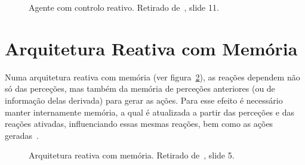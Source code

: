 \begin{figure}[H]
    \begin{center}
    \end{center}
    \caption{Agente com controlo reativo.
    Retirado de~\cite{isel:iasa:slides:arq-agentes-reativos-parte-2}, slide 11.}\label{fig:controle-reativo}
\end{figure}


\section{Arquitetura Reativa com Memória}\label{sec:arquiteturas-reativa-memoria}

Numa arquitetura reativa com memória (ver figura~\ref{fig:arquitetura-reativa-memoria}), as reações dependem não só das perceções, mas também da memória de perceções anteriores (ou de informação delas derivada) para gerar as
ações. Para esse efeito é necessário manter internamente memória, a qual é atualizada a partir das
perceções e das reações ativadas, influenciando essas mesmas reações, bem como as ações
geradas~\cite{isel:iasa:slides:arq-agentes-reativos-parte-3}.

\begin{figure}[H]
    \begin{center}
    \end{center}
    \caption{Arquitetura reativa com memória.
    Retirado de~\cite{isel:iasa:slides:arq-agentes-reativos-parte-3}, slide 5.}\label{fig:arquitetura-reativa-memoria}
\end{figure}

